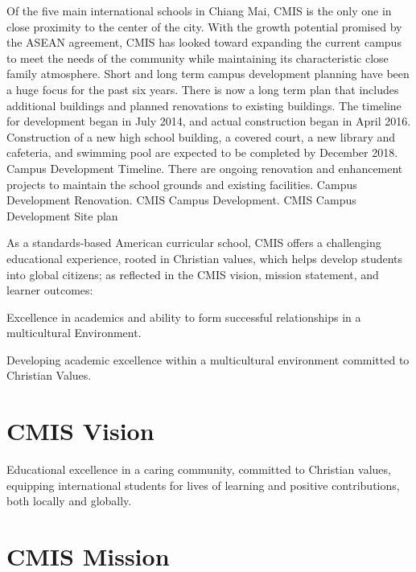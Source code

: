 \documentclass{report}
\begin{document}
Of the five main international schools in Chiang Mai, CMIS is the only one in close proximity to the center of the city.  With the growth potential promised by the ASEAN agreement, CMIS has looked toward expanding the current campus to meet the needs of the community while maintaining its characteristic close family atmosphere.  Short and long term campus development planning have been a huge focus for the past six years. There is now a long term plan that includes additional buildings and planned renovations to existing buildings.  The timeline for development began in July 2014, and actual construction began in April 2016.  Construction of a new high school building, a covered court, a new library and cafeteria, and swimming pool are expected to be completed by December 2018.  Campus Development Timeline.  There are ongoing renovation and enhancement projects to maintain the school grounds and existing facilities.   Campus Development Renovation.   CMIS Campus Development.  CMIS Campus Development Site plan

As a standards-based American curricular school, CMIS offers a challenging educational experience, rooted in Christian values, which helps develop students into global citizens; as reflected in the CMIS vision, mission statement, and learner outcomes:


Excellence in academics and ability to form successful relationships in a multicultural
Environment.



 Developing academic excellence within a multicultural environment committed to Christian Values.
\section{CMIS Vision}

Educational excellence in a caring community, committed to Christian values, equipping international students for lives of learning and positive contributions, both locally and globally.

\section{CMIS Mission}
\end{document}
